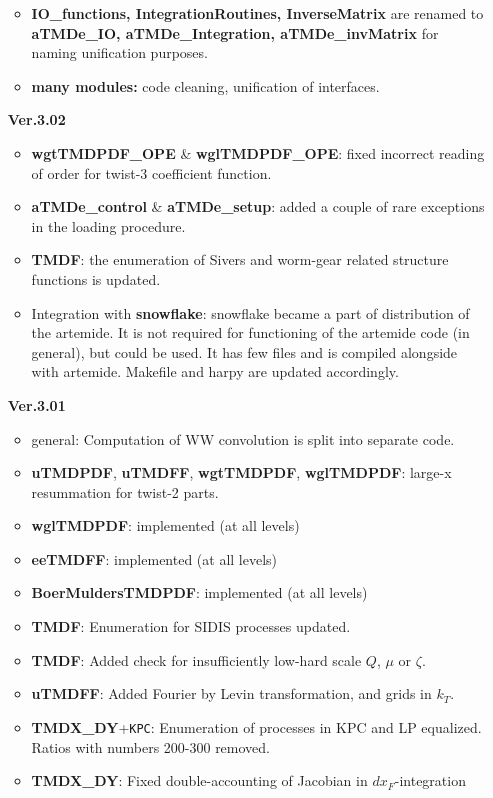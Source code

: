 \documentclass[prd,nofootinbib,eqsecnum,final]{revtex4}
\renewcommand{\(}{\left(}
\renewcommand{\)}{\right)}
\renewcommand{\[}{\left[}
\renewcommand{\]}{\right]}
\newcommand{\blue}[1]{{\color{blue} #1}}
\begin{document}
\begin{itemize}
\begin{itemize}
	\item \textbf{IO\_functions, IntegrationRoutines, InverseMatrix} are renamed to \textbf{aTMDe\_IO, aTMDe\_Integration, aTMDe\_invMatrix} for naming unification purposes.
	\item \textbf{many modules:} code cleaning, unification of interfaces.
\end{itemize}
\item[\textbf{Ver.3.02}]
\begin{itemize}
	\item \textbf{wgtTMDPDF\_OPE} \& \textbf{wglTMDPDF\_OPE}: fixed incorrect reading of order for twist-3 coefficient function.
	\item \textbf{aTMDe\_control} \& \textbf{aTMDe\_setup}: added a couple of rare exceptions in the loading procedure.
	\item \textbf{TMDF}: the enumeration of Sivers and worm-gear related structure functions is updated.
	\item \blue{Integration with \textbf{snowflake}}: snowflake became a part of distribution of the artemide. It is not required for functioning of the artemide code (in general), but could be used. It has few files and is compiled alongside with artemide. Makefile and harpy are updated accordingly.
\end{itemize}
\item[\textbf{Ver.3.01}]
\begin{itemize}
	\item general: Computation of WW convolution is split into separate code.
	\item \textbf{uTMDPDF}, \textbf{uTMDFF}, \textbf{wgtTMDPDF}, \textbf{wglTMDPDF}: large-x resummation for twist-2 parts.
	\item \textbf{wglTMDPDF}: implemented (at all levels)
	\item \textbf{eeTMDFF}: implemented (at all levels)
	\item \textbf{BoerMuldersTMDPDF}: implemented (at all levels)
	\item \textbf{TMDF}: Enumeration for SIDIS processes updated.
	\item \textbf{TMDF}: Added check for insufficiently low-hard scale $Q$, $\mu$ or $\zeta$.
	\item \textbf{uTMDFF}: Added Fourier by Levin transformation, and grids in $k_T$.
	\item \textbf{TMDX\_DY}+\texttt{KPC}: Enumeration of processes in KPC and LP equalized. Ratios with numbers 200-300 removed.
	\item \textbf{TMDX\_DY}: Fixed double-accounting of Jacobian in $dx_F$-integration 

\end{itemize}
\end{itemize}
\end{document}
